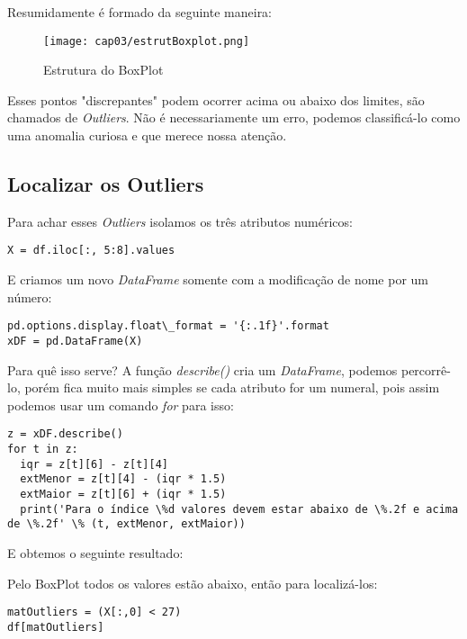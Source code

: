 Resumidamente é formado da seguinte maneira:
\begin{figure}[H]
	\centering
	\texttt{[image: cap03/estrutBoxplot.png]}
	\caption{Estrutura do BoxPlot}
\end{figure}

Esses pontos "discrepantes" podem ocorrer acima ou abaixo dos limites, são chamados de \textit{Outliers}. Não é necessariamente um erro, podemos classificá-lo como uma anomalia curiosa e que merece nossa atenção.

\subsection{Localizar os Outliers}
Para achar esses \textit{Outliers} isolamos os três atributos numéricos:
\begin{lstlisting}[]
X = df.iloc[:, 5:8].values
\end{lstlisting}

E criamos um novo \textit{DataFrame} somente com a modificação de nome por um número:
\begin{lstlisting}[]
pd.options.display.float\_format = '{:.1f}'.format
xDF = pd.DataFrame(X)
\end{lstlisting}

Para quê isso serve? A função \textit{describe()} cria um \textit{DataFrame}, podemos percorrê-lo, porém fica muito mais simples se cada atributo for um numeral, pois assim podemos usar um comando \textit{for} para isso:
\begin{lstlisting}[]
z = xDF.describe()
for t in z:
  iqr = z[t][6] - z[t][4]
  extMenor = z[t][4] - (iqr * 1.5)
  extMaior = z[t][6] + (iqr * 1.5)
  print('Para o índice \%d valores devem estar abaixo de \%.2f e acima de \%.2f' \% (t, extMenor, extMaior))
\end{lstlisting}

E obtemos o seguinte resultado: \\

Pelo BoxPlot todos os valores estão abaixo, então para localizá-los:
\begin{lstlisting}[]
matOutliers = (X[:,0] < 27)
df[matOutliers]
\end{lstlisting}

